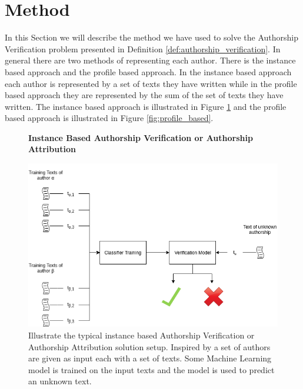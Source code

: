 \section{Method} \label{sec:method}

In this Section we will describe the method we have used to solve the Authorship
Verification problem presented in Definition \ref{def:authorship_verification}.
In general there are two methods of representing each author. There is the
instance based approach and the profile based approach. In the instance based
approach each author is represented by a set of texts they have written while
in the profile based approach they are represented by the sum of the set of
texts they have written. The instance based approach is illustrated in Figure
\ref{fig:instance_based} and the profile based approach is illustrated in Figure
\ref{fig:profile_based}.

\begin{figure}[htb]
    \centering
    \textbf{Instance Based Authorship Verification or Authorship Attribution}\par\medskip
    \includegraphics[scale=0.5]{./pictures/method/InstanceBased.png}
    \caption{Illustrate the typical instance based Authorship Verification or
        Authorship Attribution solution setup. Inspired by \citet{stamatos2009}
        a set of authors are given as input each with a set of texts. Some
        Machine Learning model is trained on the input texts and the model is
        used to predict an unknown text.}
    \label{fig:instance_based}
\end{figure}

